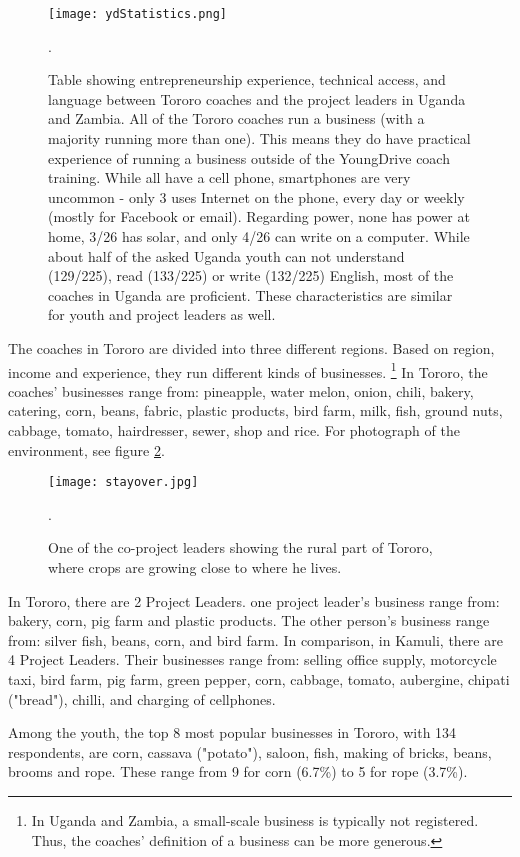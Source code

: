 \begin{figure}[h]
    \centering
    \texttt{[image: ydStatistics.png]}
    \caption{Table showing entrepreneurship experience, technical access, and language between Tororo coaches and the project leaders in Uganda and Zambia. All of the Tororo coaches run a business (with a majority running more than one). This means they do have practical experience of running a business outside of the YoungDrive coach training. While all have a cell phone, smartphones are very uncommon - only 3 uses Internet on the phone, every day or weekly (mostly for Facebook or email). Regarding power, none has power at home, 3/26 has solar, and only 4/26 can write on a computer. While about half of the asked Uganda youth can not understand (129/225), read (133/225) or write (132/225) English, most of the coaches in Uganda are proficient. These characteristics are similar for youth and project leaders as well.}.
    \label{fig:ydStatistics}
\end{figure}

The coaches in Tororo are divided into three different regions. Based on region, income and experience, they run different kinds of businesses. \footnote{In Uganda and Zambia, a small-scale business is typically not registered. Thus, the coaches' definition of a business can be more generous.} In Tororo, the coaches' businesses range from: pineapple, water melon, onion, chili, bakery, catering, corn, beans, fabric, plastic products, bird farm, milk, fish, ground nuts, cabbage, tomato, hairdresser, sewer, shop and rice. For photograph of the environment, see figure \ref{fig:tororo}.

\begin{figure}[h]
    \centering
    \texttt{[image: stayover.jpg]}
    \caption{One of the co-project leaders showing the rural part of Tororo, where crops are growing close to where he lives.}.
    \label{fig:tororo}
\end{figure}

In Tororo, there are 2 Project Leaders. one project leader's business range from: bakery, corn, pig farm and plastic products. The other person's business range from: silver fish, beans, corn, and bird farm. In comparison, in Kamuli, there are 4 Project Leaders. Their businesses range from: selling office supply, motorcycle taxi, bird farm, pig farm, green pepper, corn, cabbage, tomato, aubergine, chipati ("bread"), chilli, and charging of cellphones.

Among the youth, the top 8 most popular businesses in Tororo, with 134 respondents, are corn, cassava ("potato"), saloon, fish, making of bricks, beans, brooms and rope. These range from 9 for corn (6.7\%) to 5 for rope (3.7\%).

